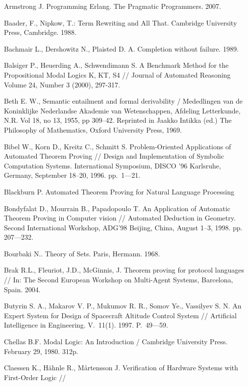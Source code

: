 \begin{thebibliography}{99}
 Armstrong J. Programming Erlang. The Pragmatic Programmers. 2007.

 Baader, F., Nipkow, T.: Term Rewriting and All That. Cambridge University Press, Cambridge. 1988.

 Bachmair L., Dershowitz N., Plaisted D. A. Completion without failure. 1989.

 Balsiger P., Heuerding A., Schwendimann S. A Benchmark Method for the Propositional Modal Logics K, KT, S4 // Journal of Automated Reasoning Volume 24, Number 3 (2000), 297-317.

 Beth E. W., Semantic entailment and formal derivability / Mededlingen van de Koninklijke Nederlandse Akademie van Wetenschappen, Afdeling Letterkunde, N.R. Vol 18, no 13, 1955, pp 309–42. Reprinted in Jaakko Intikka (ed.) The Philosophy of Mathematics, Oxford University Press, 1969.


 Bibel W., Korn D., Kreitz C., Schmitt S. Problem-Oriented Applications of Automated Theorem Proving // Design and Implementation of Symbolic Computation Systems. International Symposium, DISCO '96 Karlsruhe, Germany, September 18–20, 1996. pp.~1---21.

 Blackburn P. Automated Theorem Proving for Natural Language Processing

 Bondyfalat D., Mourrain B., Papadopoulo T. An Application of Automatic Theorem Proving in Computer vision // Automated Deduction in Geometry. Second International Workshop, ADG’98 Beijing, China, August 1–3, 1998. pp. 207---232.

 Bourbaki N.. Theory of Sets. Paris, Hermann. 1968.

 Brak R.L., Fleuriot, J.D., McGinnis, J. Theorem proving for protocol languages // In: The Second European Workshop on Multi-Agent Systems, Barcelona, Spain. 2004.

 Butyrin S. A., Makarov V. P., Mukumov R. R., Somov Ye., Vassilyev S. N. An {E}xpert {S}ystem for {D}esign of {S}pacecraft  {A}ltitude {C}ontrol {S}ystem // Artificial Intelligence in Engineering. V.~11(1). 1997. P.~49---59.

 Chellas B.F. Modal Logic: An Introduction / Cambridge University Press. February 29, 1980. 312p.

 Claessen K., Hähnle R., Mårtensson J. Verification of Hardware Systems with First-Order Logic //


\end{thebibliography}
